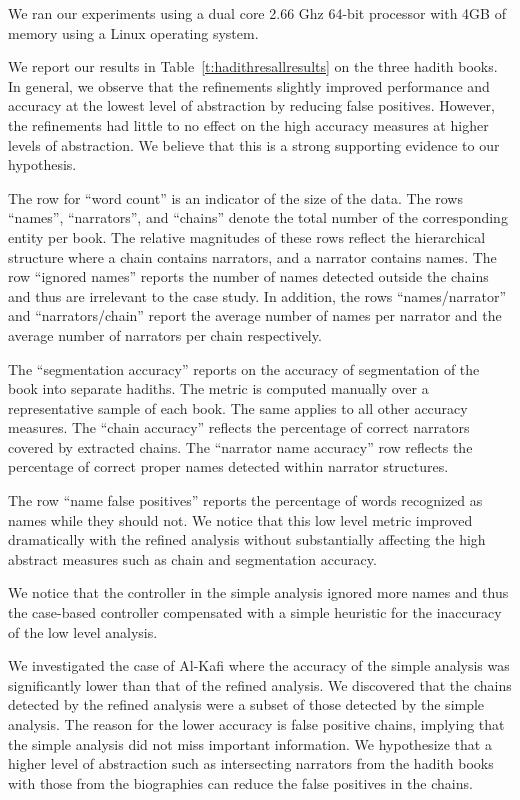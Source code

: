 \documentclass[11pt]{article}
\begin{document}
We ran our experiments using a dual core 2.66 Ghz 64-bit processor 
with 4GB of memory using a Linux operating system. 

We report our results in Table~\ref{t:hadithresallresults} on the 
three hadith books.
In general, we observe that the refinements slightly 
improved performance and accuracy at
the lowest level of abstraction by reducing false positives.
However, the refinements had little to no effect on the high 
accuracy measures at higher levels of abstraction.
We believe that this is a strong supporting evidence to our 
hypothesis.

The row for ``word count'' is an indicator of the size of the data.
The %
rows ``names'', ``narrators'', and ``chains'' denote the total
number of the corresponding entity per book.
The relative magnitudes of these rows
reflect the hierarchical structure where 
a chain contains
narrators, and a narrator contains names.
The row ``ignored names'' reports the number of names detected 
outside the chains and thus are irrelevant to
the case study.
In addition, the rows ``names/narrator'' and ``narrators/chain'' 
report the average
number of names per narrator and 
the average number of narrators per chain respectively. 

The ``segmentation accuracy'' reports on the accuracy of 
segmentation of the book into separate hadiths.
The metric is computed manually over a representative sample 
of each book.
The same applies to all other accuracy measures.
The ``chain accuracy'' reflects the percentage of correct narrators 
covered by extracted chains.
The ``narrator name accuracy'' row reflects the percentage of 
correct proper names detected within
narrator structures.

The row ``name false positives'' reports the percentage of words 
recognized as names while they should not.
We notice that this low level metric improved dramatically 
with the refined analysis without substantially affecting the 
high abstract measures such as chain and segmentation
accuracy.

We notice that the controller in the simple analysis ignored 
more names and thus the case-based
controller compensated with a simple heuristic
for the inaccuracy of the low level 
analysis.

We investigated the case of Al-Kafi where the accuracy of 
the simple analysis was significantly lower than that of the 
refined analysis. 
We discovered that the chains detected by the refined analysis 
were a subset of those detected by the simple
analysis. 
The reason for the lower accuracy is false positive chains, 
implying that the simple analysis did not miss important 
information. 
We hypothesize that a higher level of abstraction such as 
intersecting narrators from the hadith books with those from
the biographies can reduce the false positives in the chains.
\end{document}
